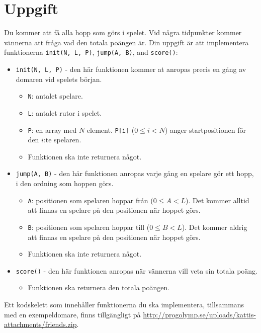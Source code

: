 \section*{Uppgift}
Du kommer att få alla hopp som görs i spelet. Vid några tidpunkter kommer vännerna att fråga vad den totala poängen är. Din uppgift är 
att implementera funktionerna \texttt{init(N, L, P)}, \texttt{jump(A, B)}, and \texttt{score()}:
\begin{itemize}
  \item \texttt{init(N, L, P)} - den här funktionen kommer at anropas precis en gång av domaren vid spelets början.
  \begin{itemize}
    \item \texttt{N}: antalet spelare.
    \item \texttt{L}: antalet rutor i spelet.
    \item \texttt{P}: en array med $N$ element. \texttt{P[i]} ($0 \le i < N$) anger startpositionen för den $i$:te spelaren.
    \item Funktionen ska inte returnera något.
  \end{itemize}

  \item \texttt{jump(A, B)} - den här funktionen anropas varje gång en spelare gör ett hopp, i den ordning som hoppen görs.
  \begin{itemize}
    \item \texttt{A}: positionen som spelaren hoppar från ($0 \le A < L$). Det kommer alltid att finnas en spelare på den positionen när hoppet görs.
    \item \texttt{B}: positionen som spelaren hoppar till ($0 \le B < L$). Det kommer aldrig att finnas en spelare på den positionen när hoppet görs.
    \item Funktionen ska inte returnera något.
  \end{itemize}

  \item \texttt{score()} - den här funktionen anropas när vännerna vill veta sin totala poäng.
  \begin{itemize}
    \item Funktionen ska returnera den totala poängen.
  \end{itemize}

\end{itemize}

Ett kodskelett som innehåller funktionerna du ska implementera, tillsammans med en exempeldomare, finns tillgängligt på
\url{http://progolymp.se/uploads/kattis-attachments/friends.zip}.

